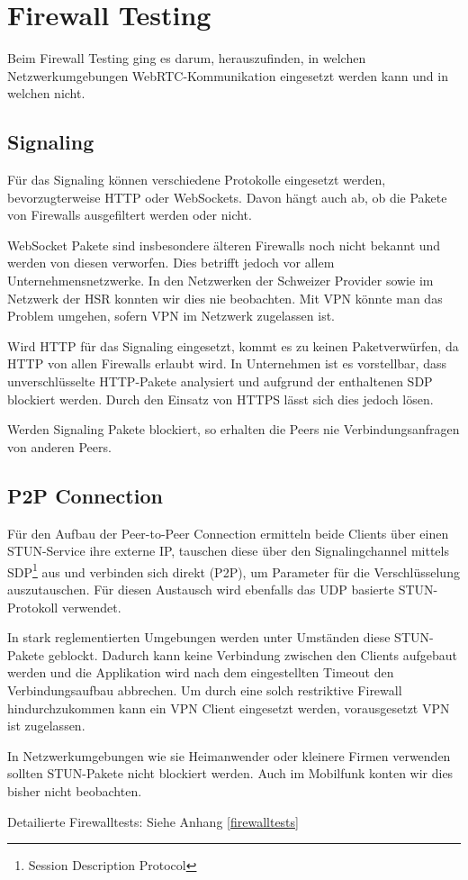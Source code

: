 	
	
\chapter{Firewall Testing}
	Beim Firewall Testing ging es darum, herauszufinden, in welchen Netzwerkumgebungen WebRTC-Kommunikation eingesetzt werden kann und in welchen nicht.
	
	
	\section{Signaling}
		Für das Signaling können verschiedene Protokolle eingesetzt werden,
		bevorzugterweise HTTP oder WebSockets. Davon hängt auch ab, ob die Pakete von
		Firewalls ausgefiltert werden oder nicht.
		
		WebSocket Pakete sind insbesondere älteren Firewalls noch nicht bekannt und
		werden von diesen verworfen. Dies betrifft jedoch vor allem Unternehmensnetzwerke.
		In den Netzwerken der Schweizer Provider sowie im Netzwerk der HSR konnten wir dies nie beobachten.
		Mit VPN könnte man das Problem umgehen, sofern VPN im Netzwerk zugelassen ist.
		
		Wird HTTP für das Signaling eingesetzt, kommt es zu keinen Paketverwürfen, da HTTP von allen Firewalls erlaubt wird.
		In Unternehmen ist es vorstellbar, dass unverschlüsselte HTTP-Pakete
		analysiert und aufgrund der enthaltenen SDP blockiert werden. Durch den Einsatz von HTTPS lässt sich dies jedoch lösen.
		
		Werden Signaling Pakete blockiert, so erhalten die Peers nie Verbindungsanfragen von anderen Peers.
		

	\section{P2P Connection}
		Für den Aufbau der Peer-to-Peer Connection ermitteln beide Clients über einen
		STUN-Service ihre externe IP, tauschen diese über den Signalingchannel
		mittels SDP\footnote{Session Description Protocol} aus und verbinden sich
		direkt (P2P), um Parameter für die Verschlüsselung auszutauschen. Für diesen
		Austausch wird ebenfalls das UDP basierte STUN-Protokoll verwendet.
		
		In stark reglementierten Umgebungen werden unter Umständen diese STUN-Pakete
		geblockt. Dadurch kann keine Verbindung zwischen den Clients aufgebaut werden und die Applikation wird nach dem eingestellten Timeout den Verbindungsaufbau abbrechen. 
		Um durch eine solch restriktive Firewall hindurchzukommen kann ein VPN Client eingesetzt werden, vorausgesetzt VPN ist zugelassen.
		
		In Netzwerkumgebungen wie sie Heimanwender oder kleinere Firmen verwenden sollten STUN-Pakete nicht blockiert werden. Auch im Mobilfunk konten wir dies bisher nicht beobachten.
	
		Detailierte Firewalltests: Siehe Anhang \ref{firewalltests}
		
		